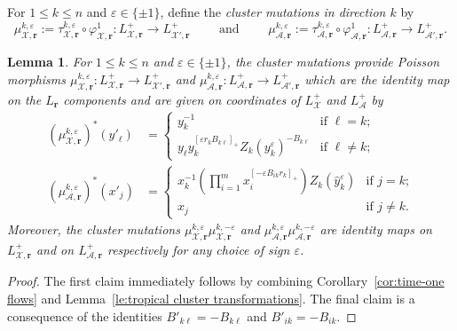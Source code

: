 \documentclass{amsart}
\newtheorem{lemma}[theorem]{Lemma}
\numberwithin{equation}{section}
\newcommand{\bfr}{{\boldsymbol{r}}}
\newcommand{\cA}{\mathcal{A}}
\newcommand{\cX}{\mathcal{X}}
\begin{document}
For $1\le k\le n$ and $\varepsilon\in\{\pm1\}$, define the \emph{cluster mutations in direction $k$} by 
\[\mu_{\cX,\bfr}^{k,\varepsilon}:=\tau_{\cX,\bfr}^{k,\varepsilon}\circ\varphi_{\cX,\bfr}^1:L^+_{\cX,\bfr}\to L^+_{\cX',\bfr}\qquad\text{ and }\qquad\mu_{\cA,\bfr}^{k,\varepsilon}:=\tau_{\cA,\bfr}^{k,\varepsilon}\circ\varphi_{\cA,\bfr}^1:L^+_{\cA,\bfr}\to L^+_{\cA',\bfr}.\]
\begin{lemma}
  \label{le:cluster mutation}
  For $1\le k\le n$ and $\varepsilon\in\{\pm1\}$, the cluster mutations provide Poisson morphisms $\mu_{\cX,\bfr}^{k,\varepsilon}:L^+_{\cX,\bfr}\to L^+_{\cX',\bfr}$ and $\mu_{\cA,\bfr}^{k,\varepsilon}:L^+_{\cA,\bfr}\to L^+_{\cA',\bfr}$ which are the identity map on the $L_\bfr$ components and are given on coordinates of $L^+_\cX$ and $L^+_\cA$ by
  \begin{align}
    \label{eq:X mutation}
    (\mu_{\cX,\bfr}^{k,\varepsilon})^*(y'_\ell)&=\begin{cases} y_k^{-1} & \text{if $\ell=k$;}\\ y_\ell y_k^{[\varepsilon r_kB_{k\ell}]_+}Z_k(y_k^\varepsilon)^{-B_{k\ell}} & \text{if $\ell\ne k$;}\end{cases}\\
    \label{eq:A mutation}
    (\mu_{\cA,\bfr}^{k,\varepsilon})^*(x'_j)&=\begin{cases} x_k^{-1}\left(\prod\limits_{i=1}^m x_i^{[-\varepsilon B_{ik}r_k]_+}\right)Z_k(\hat y_k^\varepsilon) & \text{if $j=k$;}\\ x_j & \text{if $j\ne k$.}\end{cases}
  \end{align}
  Moreover, the cluster mutations $\mu_{\cX,\bfr}^{k,\varepsilon}\mu_{\cX,\bfr}^{k,-\varepsilon}$ and $\mu_{\cA,\bfr}^{k,\varepsilon}\mu_{\cA,\bfr}^{k,-\varepsilon}$ are identity maps on $L^+_{\cX,\bfr}$ and on $L^+_{\cA,\bfr}$ respectively for any choice of sign $\varepsilon$.
\end{lemma}
\begin{proof}
  The first claim immediately follows by combining Corollary~\ref{cor:time-one flows} and Lemma~\ref{le:tropical cluster transformations}.
  The final claim is a consequence of the identities $B'_{k\ell}=-B_{k\ell}$ and $B'_{ik}=-B_{ik}$.
\end{proof}
\end{document}
